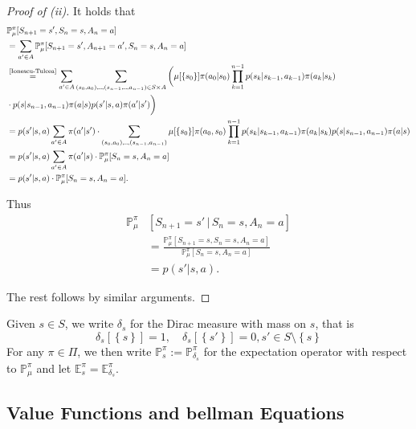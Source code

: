 \begin{proof}[Proof of (ii)]
    
It holds that
\begin{align*}
    &\mathbb{P}_\mu^\pi [S_{n+1} = s', S_n = s, A_n = a] \\
    &= \sum_{a' \in A} \mathbb{P}_\mu^\pi[ S_{n+1} = s', A_{n+1} = a', S_{n} = s, A_{n} = a]\\
    &\overset{\text{\cref{Ionescu-Tulcea}}}{=} \sum_{a' \in A} \sum_{(s_{0},a_{0}),\mydots,(s_{n-1},\mydots,a_{n-1}) \in S \times A} \bigg( \bigg. \mu[\left\{ s_{0} \right\}] \pi(a_{0}| s_{0}) \prod_{k=1}^{n-1} p(s_k | s_{k-1}, a_{k-1}) \pi(a_{k} | s_{k}) \\
    & \cdot p(s | s_{n-1}, a_{n-1}) \pi(a | s) p(s' | s,a) \pi(a' | s')\bigg.\bigg)\\
    &= p(s' | s, a) \sum_{a' \in A} \pi(a' | s') \cdot \sum_{(s_{0},a_{0}),\mydots,(s_{n-1},a_{n-1})} \mu[\left\{ s_{0} \right\}] \pi(a_{0},s_{0}) \prod_{k=1}^{n-1} p(s_{k} | s_{k-1}, a_{k-1}) \pi(a_{k} | s_{k}) p(s | s_{n-1}, a_{n-1}) \pi(a | s) \\
    &= p(s' | s, a) \sum_{a' \in A} \pi(a' | s) \cdot \mathbb{P}_\mu^\pi [S_n = s, A_n = a] \\
    &= p(s' | s, a) \cdot \mathbb{P}_\mu^\pi [ S_n = s , A_n = a].
\end{align*}

Thus 
\begin{align*}
    \mathbb{P}_\mu^\pi &[ S_{n+1} = s' \,|\, S_n = s , A_n = a]\\
    &= \frac{\mathbb{P}_{\mu}^\pi [S_{n+1} = s, S_n =s ,A_n = a]}{\mathbb{P}_\mu^\pi[ S_n = s, A_n = a]}\\
    &= p(s' | s, a).
\end{align*}

The rest follows by similar arguments.

\end{proof}


Given \( s \in S \), we write \( \delta_s \) for the Dirac measure with mass on \( s \), that is 
\[
    \delta_s[\left\{ s \right\}] = 1, \quad \delta_s[\left\{ s' \right\}] = 0, s' \in S \setminus \left\{ s \right\}
\]
For any \( \pi \in \Pi  \), we then write \( \mathbb{P}_s^\pi := \mathbb{P}_{\delta_s}^\pi\) for the expectation operator with respect to \( \mathbb{P}_\mu^\pi \) and let \( \mathbb{E}_s^\pi = \mathbb{E}_{\delta_s}^\pi \).
 


\subsection{Value Functions and bellman Equations}

